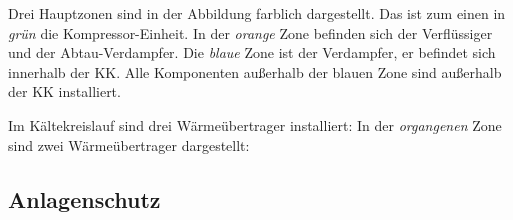 Drei Hauptzonen sind in der Abbildung farblich dargestellt. Das ist zum einen in \textit{grün} die Kompressor-Einheit. In der \textit{orange} Zone befinden sich der Verflüssiger und der Abtau-Verdampfer. Die \textit{blaue} Zone ist der Verdampfer, er befindet sich innerhalb der KK. Alle Komponenten außerhalb der blauen Zone sind außerhalb der KK installiert. 

 Im Kältekreislauf sind drei Wärmeübertrager installiert: In der \textit{organgenen} Zone sind zwei Wärmeübertrager dargestellt:

\subsection{Anlagenschutz}
\label{subsec: Anlagenschutz}